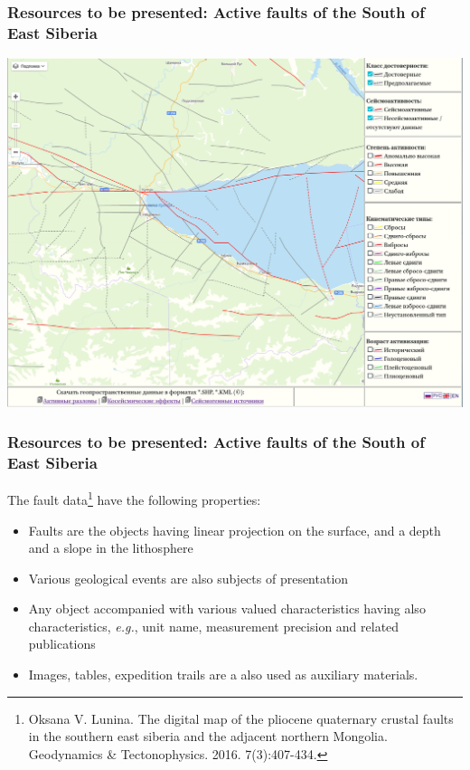 \documentclass[10pt]{beamer}
\begin{document}
\begin{frame}
  \frametitle{Resources to be presented: Active faults of the South of
    East Siberia}
  \centering
   \includegraphics[width=0.9\linewidth]{activetectonics.png}
\end{frame}

\begin{frame}
  \frametitle{Resources to be presented: Active faults of the South of
    East Siberia}
  The fault data\footnote{Oksana V. Lunina.  The digital map of the pliocene quaternary crustal faults in the southern east siberia and the adjacent northern Mongolia. Geodynamics \& Tectonophysics. 2016. 7(3):407-434. 
} have the following properties:
  \begin{itemize}
  \item Faults are the objects having linear projection on the surface, and a depth and a slope in the lithosphere
  \item Various geological events are also subjects of presentation
  \item Any object accompanied with various valued characteristics having also characteristics, \emph{e.g.}, unit name, measurement precision and related publications
  \item Images, tables, expedition trails are a also used as auxiliary materials.
  \end{itemize}
\end{frame}
\end{document}
